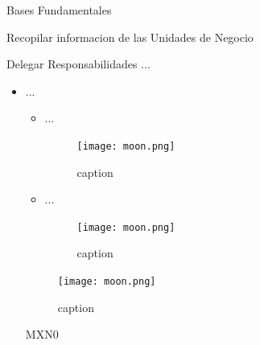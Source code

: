 \documentclass[12pt,letterpaper]{article}
\begin{document}
{\newpage

  \begin{section}
  {\color{kblue} Bases Fundamentales}

    \begin{subsection}
    {\color{kgreen}Recopilar informacion de las Unidades de Negocio}
    \end{subsection}

    \begin{subsubsection}
    {\color{kgray}Delegar Responsabilidades ...}
    \end{subsubsection}

    \begin{itemize}
	\item[\ding{229}]{...}

	\begin{itemize}
	    \item[\ding{237}]{...
		\begin{figure}[htb]
		    \centering
		    \texttt{[image: moon.png]}
		    \caption{caption}
		    \label{luna}
		\end{figure}
	    }
	\end{itemize}

	\begin{itemize}
	    \item[\ding{237}]{...
		\begin{figure}[htb]
		    \centering
		    \texttt{[image: moon.png]}
		    \caption{caption}
		    \label{luna}
		\end{figure}
	    }
	\end{itemize}

	\begin{figure}[htb]
	    \centering
	    \texttt{[image: moon.png]}
	    \caption{caption}
	    \label{luna}
	\end{figure}
	
	\footnotesize{\scshape{
	  \begin{invoice}{MXN}{0}
	    
	  \end{invoice}
	    }%
	  }%
	  

\end{itemize}
\end{section}}
\end{document}
